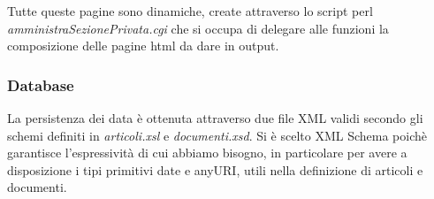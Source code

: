 	Tutte queste pagine sono dinamiche, create attraverso lo script perl \textit{amministraSezionePrivata.cgi} che si occupa di delegare alle funzioni la composizione delle pagine html da dare in output.
	
\subsubsection{Database}
	La persistenza dei data \`e ottenuta attraverso due file XML validi secondo gli schemi definiti in \textit{articoli.xsl} e \textit{documenti.xsd}. Si \`e scelto XML Schema poich\`e garantisce l'espressivit\`a di cui abbiamo bisogno, in particolare per avere a disposizione i tipi primitivi date e anyURI, utili nella definizione di articoli e documenti.